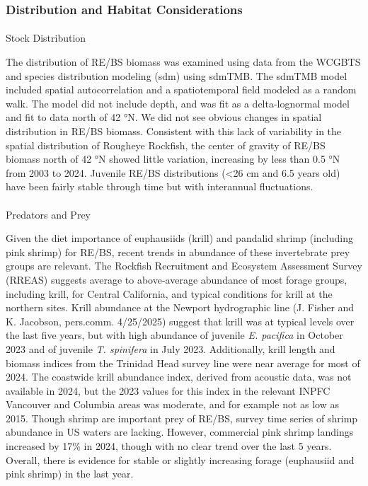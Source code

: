 \documentclass[
]{scrartcl}
\makeatletter
\let\oldparagraph\paragraph
\renewcommand{\paragraph}{
    \@ifstar
      \xxxParagraphStar
      \xxxParagraphNoStar
  }
\newcommand{\xxxParagraphStar}[1]{\oldparagraph*{#1}\mbox{}}
\newcommand{\xxxParagraphNoStar}[1]{\oldparagraph{#1}\mbox{}}
\makeatother
\begin{document}
\subsubsection{Distribution and Habitat
Considerations}\label{distribution-and-habitat-considerations}

\paragraph{Stock Distribution}\label{stock-distribution}

The distribution of RE/BS biomass was examined using data from the
WCGBTS and species distribution modeling (sdm) using sdmTMB. The sdmTMB
model included spatial autocorrelation and a spatiotemporal field
modeled as a random walk. The model did not include depth, and was fit
as a delta-lognormal model and fit to data north of 42 °N. We did not
see obvious changes in spatial distribution in RE/BS biomass. Consistent
with this lack of variability in the spatial distribution of Rougheye
Rockfish, the center of gravity of RE/BS biomass north of 42 °N showed
little variation, increasing by less than 0.5 °N from 2003 to 2024.
Juvenile RE/BS distributions (\textless26 cm and 6.5 years old) have
been fairly stable through time but with interannual fluctuations.

\paragraph{Predators and Prey}\label{predators-and-prey}

Given the diet importance of euphausiids (krill) and pandalid shrimp
(including pink shrimp) for RE/BS, recent trends in abundance of these
invertebrate prey groups are relevant. The Rockfish Recruitment and
Ecosystem Assessment Survey (RREAS) suggests average to above-average
abundance of most forage groups, including krill, for Central
California, and typical conditions for krill at the northern sites.
Krill abundance at the Newport hydrographic line (J. Fisher and K.
Jacobson, pers.comm. 4/25/2025) suggest that krill was at typical levels
over the last five years, but with high abundance of juvenile \emph{E.
pacifica} in October 2023 and of juvenile \emph{T. spinifera} in July
2023. Additionally, krill length and biomass indices from the Trinidad
Head survey line were near average for most of 2024. The coastwide krill
abundance index, derived from acoustic data, was not available in 2024,
but the 2023 values for this index in the relevant INPFC Vancouver and
Columbia areas was moderate, and for example not as low as 2015. Though
shrimp are important prey of RE/BS, survey time series of shrimp
abundance in US waters are lacking. However, commercial pink shrimp
landings increased by 17\% in 2024, though with no clear trend over the
last 5 years. Overall, there is evidence for stable or slightly
increasing forage (euphausiid and pink shrimp) in the last year.
\end{document}
